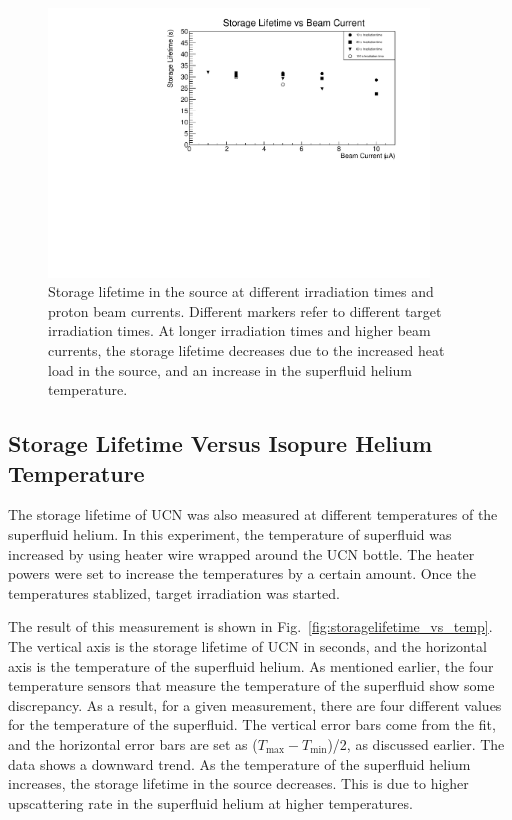 \begin{figure}[h!]
  \centering
  \includegraphics[width=0.9\textwidth]{StorageLifetime_17009_and_17009A.pdf}
  \caption[UCN storage lifetime at different irradiation times and
  proton beam currents]{Storage lifetime in the source at different
    irradiation times and proton beam currents. Different markers
    refer to different target irradiation times. At longer irradiation
    times and higher beam currents, the storage lifetime decreases due
    to the increased heat load in the source, and an increase in the
    superfluid helium temperature.}
  \label{fig:storage_beam_irrad}
\end{figure}


\subsection{Storage Lifetime Versus Isopure Helium Temperature}
The storage lifetime of UCN was also measured at different
temperatures of the superfluid helium. In this experiment, the
temperature of superfluid was increased by using heater wire wrapped
around the UCN bottle. The heater powers were set to increase the
temperatures by a certain amount. Once the temperatures stablized,
target irradiation was started.

The result of this measurement is shown in
Fig.~\ref{fig:storagelifetime_vs_temp}. The vertical axis is the
storage lifetime of UCN in seconds, and the horizontal axis is the
temperature of the superfluid helium. As mentioned earlier, the four
temperature sensors that measure the temperature of the superfluid
show some discrepancy. As a result, for a given measurement, there are
four different values for the temperature of the superfluid. The
vertical error bars come from the fit, and the horizontal error bars
are set as ($T_{\mathrm{max}} - T_{\mathrm{min}}$)/2, as discussed
earlier. The data shows a downward trend. As the temperature of the
superfluid helium increases, the storage lifetime in the source
decreases. This is due to higher upscattering rate in the superfluid
helium at higher temperatures.


